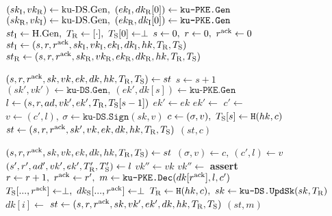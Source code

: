 \algrenewcommand\textproc{}
\algrenewcommand{}

\begin{minipage}{1\linewidth}
  {\fontsize{10}{12}\selectfont

  \begin{algorithmic}[1]
    \State $(sk_\t{I},vk_\t{R}) \gets \t{ku-DS.Gen}, \ (ek_\t{I},dk_\t{R}[0]) \gets
    \texttt{ku-PKE.Gen}$
    \State $(sk_\t{R},vk_\t{I}) \gets \t{ku-DS.Gen}, \ (ek_\t{R},dk_\t{I}[0]) \gets
    \texttt{ku-PKE.Gen}$
    \State $st_\text{I} \gets \text{H.Gen}, \ T_\text{R} \gets [\cdot], \ T_\text{S}[0] \gets \perp$
    \State $s \gets 0, \ r \gets 0, \ r^\t{ack} \gets 0$
    \State $st_\text{I} \gets (s,r,r^\text{ack},sk_\text{I},vk_\text{I},ek_\text{I},dk_\text{I},hk,T_\text{R},T_\text{S})$
    \State $st_\text{R} \gets (s,r,r^\text{ack},sk_\text{R},vk_\text{R},ek_\text{R},dk_\text{R},hk,T_\text{R},T_\text{S})$
    \EndProcedure
    
    \item[]
    
    \State $(s,r,r^\text{ack},sk,vk,ek,dk,hk,T_\text{R},T_\text{S}) \gets st$
    \State $s \gets s+1$
    \State $(sk',vk') \gets \texttt{ku-DS.Gen}, \ (ek',dk[s]) \gets \texttt{ku-PKE.Gen}$
    \State $l \gets (s,r,ad,vk',ek',T_\text{R},T_\text{S}[s-1])$
    \State $ek' \gets ek$
    \State $ek' \gets$ 
    \EndFor
    \State $c' \gets$ 
    \State $v \gets (c',l), \ \sigma \gets \texttt{ku-DS.Sign}(sk,v)$
    \State $c \gets (\sigma,v), \ T_\text{S}[s] \gets \texttt{H}(hk,c)$
    \State $st \gets (s,r,r^\text{ack},sk',vk,ek,dk,hk,T_\text{R},T_\text{S})$
    \State \Return $(st,c)$
    \EndProcedure

    \item[]

    \State $(s,r,r^\text{ack},sk,vk,ek,dk,hk,T_\text{R},T_\text{S}) \gets st$
    \State $(\sigma,v) \gets c, \ (c',l) \gets v$
    \State $(s',r',ad',vk',ek',T_\text{R}',T_\text{S}') \gets l$
    \State $vk'' \gets vk$
    \State $vk'' \gets$ 
    \EndFor
    \State \textbf{assert} 
    \State $r \gets r+1, \ r^\t{ack} \gets r' , \ m \gets \texttt{ku-PKE.Dec}(dk[r^\t{ack}],l,c')$
    \State $T_\t{S}[...,r^\t{ack}] \gets \perp, \ dk_\t{S}[...,r^\t{ack}] \gets \perp$
    \State $T_\text{R} \gets \texttt{H}(hk,c), \ sk \gets \texttt{ku-DS.UpdSk}(sk,T_\text{R})$
    \State $dk[i] \gets$ 
    \EndFor
    \State $st \gets (s,r,r^\text{ack},sk,vk',ek',dk,hk,T_\text{R},T_\text{S})$
    \State \Return $(st,m)$
    \EndProcedure

  \end{algorithmic}
  }
\end{minipage}